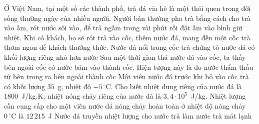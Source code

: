 	\begin{ex}%
		Ở Việt Nam, tại một số các thành phố, trà đá vỉa hè là một thói quen trong đời sống thường ngày của nhiều người. Người bán thường pha trà bằng cách cho trà vào ấm, rót nước sôi vào, để trà ngấm trong vài phút rồi đặt ấm vào bình giữ nhiệt. Khi có khách, họ sẽ rót trà vào cốc, thêm nước đá, mang đến một cốc trà thơm ngon để khách thưởng thức.
		\choiceTFt
		{\True Nước đá nổi trong cốc trà chứng tỏ nước đá có khối lượng riêng nhỏ hơn nước}
		{Sau một thời gian thả nước đá vào cốc, ta thấy bên ngoài cốc có nước bám vào thành cốc. Hiện tượng này là do nước thẩm thấu từ bên trong ra bên ngoài thành cốc}
		{\True Một viên nước đá trước khi bỏ vào cốc trà có khối lượng $35$~g, nhiệt độ $-5\,^\circ\text{C}$. Cho biết nhiệt dung riêng của nước đá là $1800$~J/kg.K; nhiệt nóng chảy riêng của nước đá là $3{,}4\cdot 10^5$~J/kg. Nhiệt lượng cần cung cấp cho một viên nước đá nóng chảy hoàn toàn ở nhiệt độ nóng chảy $0\,^\circ\text{C}$ là $12\,215$~J}
		{Nước đá truyền nhiệt lượng cho nước trà làm nước trà mát lạnh}
	\end{ex}

